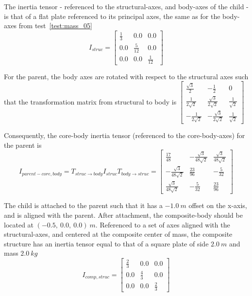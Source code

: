 \begin{description}
The inertia tensor - referenced to the structural-axes, and body-axes of the
child - is that of a flat plate referenced to its principal axes, the same as
for the body-axes from test~\ref{test:mass_05}
\begin{equation*}
I_{struc} =
   \begin{bmatrix} \frac{1}{3} & 0.0   & 0.0  \\
                   0.0   & \frac{5}{12} & 0.0   \\
                    0.0  & 0.0   & \frac{1}{12}
   \end{bmatrix}
\end{equation*}

For the parent, the body axes are rotated with respect to the structural axes
such that the transformation matrix from structural to body is
$
   \begin{bmatrix} \frac{\sqrt{3}}{2} & -\frac{1}{2}   & 0  \\
                   \frac{1}{2\sqrt{2}}   & \frac{\sqrt{3}}{2\sqrt{2}} &
                   \frac{1}{\sqrt{2}}   \\
                   -\frac{1}{2\sqrt{2}}   & -\frac{\sqrt{3}}{2\sqrt{2}} &
                   \frac{1}{\sqrt{2}}
   \end{bmatrix}
$

Consequently, the core-body inertia tensor (referenced to the core-body-axes)
for the parent is
 \begin{equation}
I_{parent-core, body} = T_{struc \rightarrow body} I_{struc} T_{body
\rightarrow struc} =
 \begin{bmatrix}
 \frac{17}{48} & -\frac{\sqrt{3}}{48\sqrt{2}} & \frac{\sqrt{3}}{48\sqrt{2}}  \\
 -\frac{\sqrt{3}}{48\sqrt{2}} & \frac{23}{96} & -\frac{5}{32}   \\
 \frac{\sqrt{3}}{48\sqrt{2}} & -\frac{5}{32} & \frac{23}{96}
   \end{bmatrix}
\label{eq:body_rotation}
\end{equation}

The child is attached to the parent such that it has a $-1.0~m$ offset on the
x-axis, and is aligned with the parent.  After attachment, the composite-body
should be located at $(-0.5,~0.0,~0.0)~m$.  Referenced to a set of axes
aligned with the structural-axes, and centered at the composite center of
mass, the composite structure has an inertia tensor equal to that of a square
plate of side $2.0~m$ and mass $2.0~kg$
\begin{equation*}
  I_{comp,struc} =
   \begin{bmatrix} \frac{2}{3} & 0.0   & 0.0  \\
                   0.0   & \frac{4}{3} & 0.0   \\
                    0.0  & 0.0   & \frac{2}{3}
   \end{bmatrix}
\end{equation*}


\end{description}
